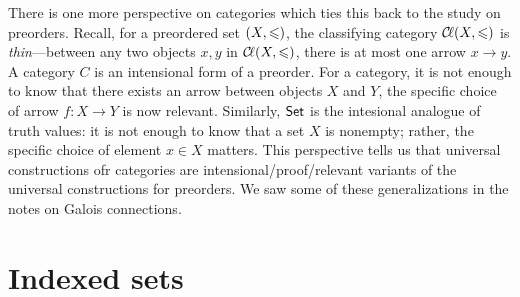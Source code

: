 \documentclass[../main.tex]{subfiles}
\begin{document}
There is one more perspective on categories which ties this back to the study on
preorders. Recall, for a preordered set \({\left(X,\leqslant\right)}\), the classifying
category \({\mathcal{C}\kern-.15em\ell}{\left(X,\leqslant\right)}\) is \emph{thin}---between any two objects \(x,y\)
in \({\mathcal{C}\kern-.15em\ell}{\left(X,\leqslant\right)}\), there is at most one arrow \(x \to y\). A category
\(C\) is an intensional form of a preorder. For a category, it is not enough to
know that there exists an arrow between objects \(X\) and \(Y\), the specific
choice of arrow \(f: X \to Y\) is now relevant. Similarly, \({\mathsf{Set}}\) is the
intesional analogue of truth values: it is not enough to know that a set \(X\)
is nonempty; rather, the specific choice of element \(x \in X\) matters. This
perspective tells us that universal constructions ofr categories are
intensional/proof\-/relevant variants of the universal constructions for
preorders. We saw some of these generalizations in the notes on Galois
connections.

\section{Indexed sets}
\end{document}
